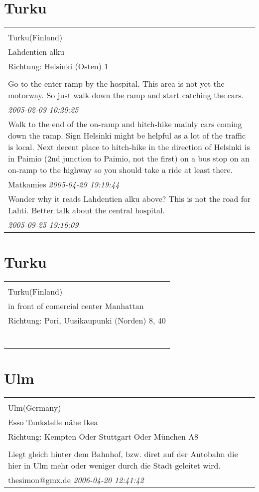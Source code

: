 \documentclass[a4paper,12pt]{article}
\begin{document}
\section{Turku}
\begin{tabular}{|p{13cm}|}
\hline\\
Turku(Finland)\\
Lahdentien alku\\
Richtung: Helsinki (Osten) 1 \\
\hline\\
Go to the enter ramp by the hospital. This area is not yet the motorway. So just walk down the ramp and start catching the cars. \\
\textit{ 2005-02-09 10:20:25 }\\\hline Walk to the end of the on-ramp and hitch-hike mainly cars coming down the ramp. Sign Helsinki might be helpful as a lot of the traffic is local. Next decent place to hitch-hike in the direction of Helsinki is in Paimio (2nd junction to Paimio, not the first) on a bus stop on an on-ramp to the highway so you should take a ride at least there. \\
Matkamies \textit{ 2005-04-29 19:19:44 }\\\hline Wonder why it reads Lahdentien alku above? This is not the road for Lahti. Better talk about the central hospital. \\
\textit{ 2005-09-25 19:16:09 }\\\hline
\end{tabular}


\section{Turku}
\begin{tabular}{|p{13cm}|}
\hline\\
Turku(Finland)\\
in front of comercial center Manhattan\\
Richtung: Pori, Uusikaupunki (Norden) 8, 40 \\
\hline\\
\\\
\end{tabular}


\section{Ulm}
\begin{tabular}{|p{13cm}|}
\hline\\
Ulm(Germany)\\
Esso Tankstelle nähe Ikea\\
Richtung: Kempten Oder Stuttgart Oder München A8 \\
\hline\\
Liegt gleich hinter dem Bahnhof, bzw. diret auf der Autobahn die hier in Ulm mehr oder weniger durch die Stadt geleitet wird. \\
thesimon@gmx.de \textit{ 2006-04-20 12:41:42 }\\\hline
\end{tabular}
\end{document}
